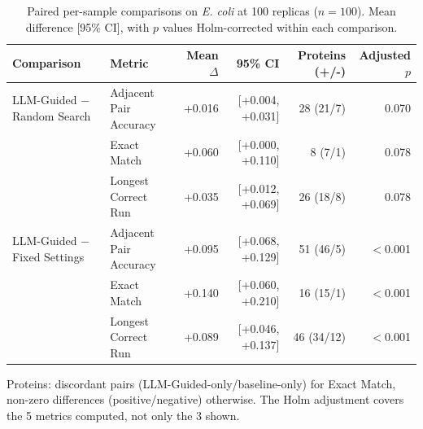\begin{table}[!t]
  \centering
  \caption{Paired per-sample comparisons on \textit{E. coli} at 100 replicas ($n=100$). Mean difference [95\% CI], with $p$ values Holm-corrected within each comparison.}
  \label{tab:paired_tests}
  \begin{tabular}{llrrrr}
    \toprule
    Comparison & Metric & Mean $\Delta$ & 95\% CI & Proteins (+/-) & Adjusted $p$ \\
    \midrule
    LLM-Guided $-$ Random Search & Adjacent Pair Accuracy & +0.016 & [+0.004, +0.031] & 28 (21/7) & 0.070 \\
     & Exact Match & +0.060 & [+0.000, +0.110] & 8 (7/1) & 0.078 \\
     & Longest Correct Run & +0.035 & [+0.012, +0.069] & 26 (18/8) & 0.078 \\
    \midrule
    LLM-Guided $-$ Fixed Settings & Adjacent Pair Accuracy & +0.095 & [+0.068, +0.129] & 51 (46/5) & $<$0.001 \\
     & Exact Match & +0.140 & [+0.060, +0.210] & 16 (15/1) & $<$0.001 \\
     & Longest Correct Run & +0.089 & [+0.046, +0.137] & 46 (34/12) & $<$0.001 \\
    \bottomrule
  \end{tabular}
  \par\smallskip\footnotesize{Proteins: discordant pairs (LLM-Guided-only/baseline-only) for Exact Match, non-zero differences (positive/negative) otherwise. The Holm adjustment covers the 5 metrics computed, not only the 3 shown.}
\end{table}
